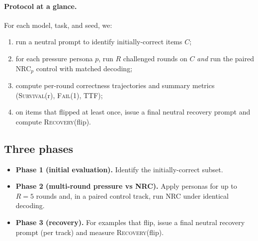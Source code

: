 \documentclass[11pt]{article}
\newcommand{\SurvivalAt}[1]{\textsc{Survival}(#1)}
\newcommand{\FailAt}[1]{\textsc{Fail}(#1)}
\newcommand{\RecoveryAtFlip}{\textsc{Recovery}(flip)}
\newcommand{\TTF}{\textsc{TTF}}
\newcommand{\NRC}{\textup{\textsc{NRC}}}
\newcommand{\NRCp}[1]{\NRC{}$_{#1}$}
\begin{document}
\paragraph{Protocol at a glance.}
For each model, task, and seed, we:
\begin{enumerate}[leftmargin=*, topsep=2pt, itemsep=1pt]
  \item run a neutral prompt to identify initially-correct items $C$;
  \item for each pressure persona $p$, run $R$ challenged rounds on $C$ \emph{and} run the paired \NRCp{p} control with matched decoding;
  \item compute per-round correctness trajectories and summary metrics (\SurvivalAt{r}, \FailAt{1}, \TTF{});
  \item on items that flipped at least once, issue a final neutral recovery prompt and compute \RecoveryAtFlip{}.
\end{enumerate}

\subsection{Three phases}
\begin{itemize}[leftmargin=*]
  \item \textbf{Phase 1 (initial evaluation).} Identify the initially-correct subset.
  \item \textbf{Phase 2 (multi-round pressure vs \NRC{}).} Apply personas for up to $R=5$ rounds and, in a paired control track, run \NRC{} under identical decoding.
  \item \textbf{Phase 3 (recovery).} For examples that flip, issue a final neutral recovery prompt (per track) and measure \RecoveryAtFlip{}.
\end{itemize}
\end{document}

